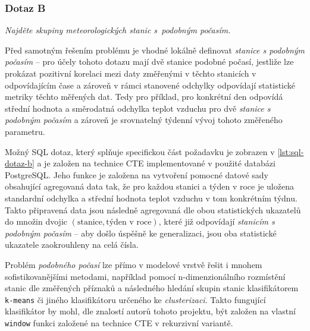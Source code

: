 \documentclass[10pt,a4paper,titlepage]{extarticle}
\begin{document}
    \subsubsection{Dotaz B}
    \emph{Najděte skupiny meteorologických stanic s~podobným počasím.}

    Před samotným řešením problému je vhodné lokálně definovat \emph{stanice s podobným počasím} -- pro účely tohoto
    dotazu mají dvě stanice podobné počasí, jestliže lze prokázat pozitivní korelaci mezi daty změřenými v těchto
    stanicích v odpovídajícím čase a zároveň v rámci stanovené odchylky odpovídají statistické metriky těchto
    měřených dat. Tedy pro příklad, pro konkrétní den odpovídá střední hodnota a směrodatná odchylka teplot vzduchu
    pro dvě \emph{stanice s podobným počasím} a zároveň je srovnatelný týdenní vývoj tohoto změřeného parametru.

    Možný SQL dotaz, který splňuje specifickou část požadavku je zobrazen v \ref{lst:sql-dotaz-b} a je založen na
    technice CTE implementované v použité databázi PostgreSQL. Jeho funkce je založena na vytvoření pomocné datové
    sady obsahující agregovaná data tak, že pro každou stanici a týden v roce je uložena standardní odchylka a
    střední hodnota teplot vzduchu v tom konkrétním týdnu. Takto připravená data jsou následně agregovaná dle obou
    statistických ukazatelů do množin dvojic $(\text{stanice}, \text{týden v roce})$, které již odpovídají
    \emph{stanicím s podobným počasím} -- aby došlo úspěšně ke generalizaci, jsou oba statistické ukazatele
    zaokrouhleny na celá čísla.

    Problém \emph{podobného počasí} lze přímo v modelové vrstvě řešit i mnohem sofistikovanějšími
    metodami, například pomocí n-dimenzionálního rozmístění stanic dle změřených příznaků a následného hledání 
    skupin stanic klasifikátorem \texttt{k-means} či jiného klasifikátoru určeného ke \emph{clusterizaci}. Takto
    fungující klasifikátor by mohl, dle znalostí autorů tohoto projektu, být založen na vlastní \texttt{window}
    funkci založené na technice CTE v rekurzivní variantě.
\end{document}
